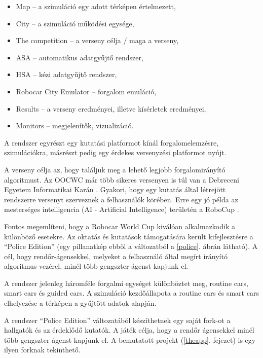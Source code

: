 \documentclass[a4paper,12pt]{report}
\begin{document}
\begin{itemize}
\item Map -- a szimuláció egy adott térképen értelmezett,
\item City -- a szimuláció működési egysége,
\item The competition -- a verseny célja / maga a verseny,
\item ASA -- automatikus adatgyűjtő rendszer,
\item HSA -- kézi adatgyűjtő rendszer,
\item Robocar City Emulator -- forgalom emuláció,
\item Results -- a verseny eredményei, illetve kísérletek eredményei,
\item Monitors -- megjelenítők, vizualizáció.
\end{itemize}

A rendszer egyrészt egy kutatási platformot kínál forgalomelemzésre, szimulációkra, másrészt pedig egy érdekes versenyzési platformot nyújt.

\vspace{2mm}
A verseny célja az, hogy találjuk meg a lehető legjobb forgalomirányító algoritmust. Az OOCWC már több sikeres versenyen is túl van a Debreceni Egyetem Informatikai Karán \cite{competitions}. Gyakori, hogy egy kutatás által létrejött rendszerre versenyt szerveznek a felhasználók körében. Erre egy jó példa az mesterséges intelligencia (AI - Artificial Intelligence) területén a RoboCup \cite{robocup}.

\vspace{2mm}
Fontos megemlíteni, hogy a Robocar World Cup kiválóan alkalmazkodik a különböző esetekre. Az oktatás és kutatások támogatására került kifejlesztésre a ``Police Edition'' (egy pillanatkép ebből a változatból a \ref{police}. ábrán látható). A cél, hogy rendőr-ágensekkel, melyeket a felhasználó által megírt irányító algoritmus vezérel, minél több gengszter-ágenst kapjunk el.

\vspace{2mm}
A rendszer jelenleg háromféle forgalmi egységet különböztet meg, routine cars, smart cars és guided cars. A szimuláció kezdőállapota a routine cars és smart cars elhelyezése a térképen a gyűjtött adatok alapján.

\vspace{2mm}
A rendszer ``Police Edition'' változatából készíthetnek egy saját fork-ot a hallgatók és az érdeklődő kutatók. A játék célja, hogy a rendőr ágensekkel minél több gengszter ágenst kapjunk el. A bemutatott projekt (\ref{theapp}. fejezet) is egy ilyen forknak tekinthető.
\end{document}
